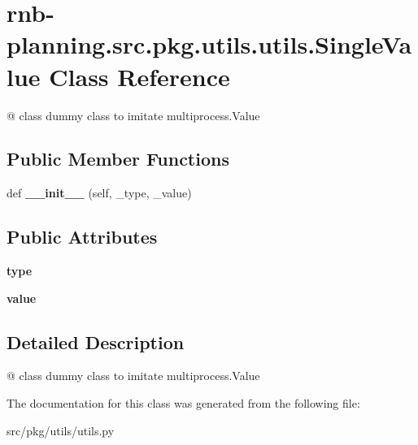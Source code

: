 \hypertarget{classrnb-planning_1_1src_1_1pkg_1_1utils_1_1utils_1_1_single_value}{}\section{rnb-\/planning.src.\+pkg.\+utils.\+utils.\+Single\+Value Class Reference}
\label{classrnb-planning_1_1src_1_1pkg_1_1utils_1_1utils_1_1_single_value}


@ class dummy class to imitate multiprocess.\+Value  


\subsection*{Public Member Functions}
\begin{DoxyCompactItemize}
\item 
\mbox{\label{classrnb-planning_1_1src_1_1pkg_1_1utils_1_1utils_1_1_single_value_aa3d7b9f36b724875a38de99ed4ef4b0d}} 
def {\bfseries \+\_\+\+\_\+init\+\_\+\+\_\+} (self, \+\_\+type, \+\_\+value)
\end{DoxyCompactItemize}
\subsection*{Public Attributes}
\begin{DoxyCompactItemize}
\item 
\mbox{\label{classrnb-planning_1_1src_1_1pkg_1_1utils_1_1utils_1_1_single_value_a0803949fc0ae77b8fc65ed4434589849}} 
{\bfseries type}
\item 
\mbox{\label{classrnb-planning_1_1src_1_1pkg_1_1utils_1_1utils_1_1_single_value_a56b821bf17cc08afd7e5cb206890cff6}} 
{\bfseries value}
\end{DoxyCompactItemize}


\subsection{Detailed Description}
@ class dummy class to imitate multiprocess.\+Value 

The documentation for this class was generated from the following file\+:\begin{DoxyCompactItemize}
\item 
src/pkg/utils/utils.\+py\end{DoxyCompactItemize}
